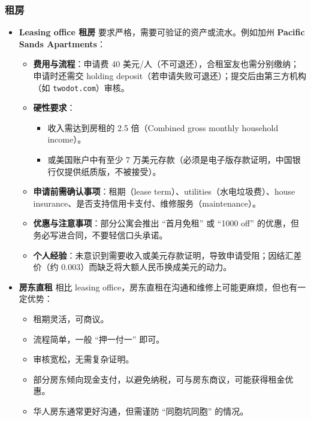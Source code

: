 \subsubsection*{租房}

\begin{itemize}
    \item \textbf{Leasing office 租房}  
    要求严格，需要可验证的资产或流水。例如加州 \textbf{Pacific Sands Apartments}：
    \begin{itemize}
        \item \textbf{费用与流程}：申请费 40 美元/人（不可退还），合租室友也需分别缴纳；申请时还需交 holding deposit（若申请失败可退还）；提交后由第三方机构（如 \texttt{twodot.com}）审核。
        \item \textbf{硬性要求}：
        \begin{itemize}
            \item 收入需达到房租的 2.5 倍（Combined gross monthly household income）。
            \item 或美国账户中有至少 7 万美元存款（必须是电子版存款证明，中国银行仅提供纸质版，不被接受）。
        \end{itemize}
        \item \textbf{申请前需确认事项}：租期（lease term）、utilities（水电垃圾费）、house insurance、是否支持信用卡支付、维修服务（maintenance）。
        \item \textbf{优惠与注意事项}：部分公寓会推出 ``首月免租'' 或 ``1000 off'' 的优惠，但务必写进合同，不要轻信口头承诺。
        \item \textbf{个人经验}：未意识到需要收入或美元存款证明，导致申请受阻；因结汇差价（约 0.003）而缺乏将大额人民币换成美元的动力。
    \end{itemize}
    
    \item \textbf{房东直租}  
    相比 leasing office，房东直租在沟通和维修上可能更麻烦，但也有一定优势：
    \begin{itemize}
        \item 租期灵活，可商议。  
        \item 流程简单，一般 “押一付一” 即可。  
        \item 审核宽松，无需复杂证明。  
        \item 部分房东倾向现金支付，以避免纳税，可与房东商议，可能获得租金优惠。  
        \item 华人房东通常更好沟通，但需谨防 ``同胞坑同胞'' 的情况。  
    \end{itemize}
    

\end{itemize}
